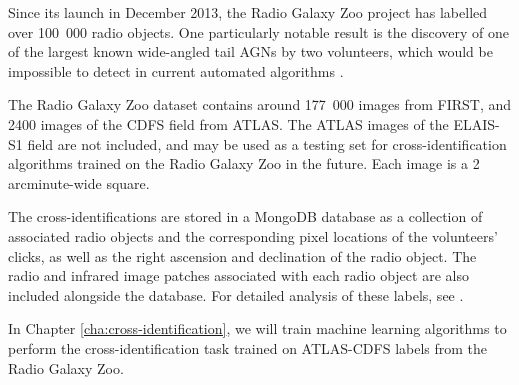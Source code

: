     Since its launch in December 2013, the Radio Galaxy Zoo project has labelled
    over 100~000 radio objects. One particularly notable result is the discovery
    of one of the largest known wide-angled tail AGNs by two volunteers, which
    would be impossible to detect in current automated algorithms
    \citep{banfield16}.

    The Radio Galaxy Zoo dataset contains around 177~000 images from FIRST, and
    2400 images of the CDFS field from ATLAS. The ATLAS images of the ELAIS-S1
    field are not included, and may be used as a testing set for
    cross-identification algorithms trained on the Radio Galaxy Zoo in the
    future. Each image is a 2 arcminute-wide square.

    The cross-identifications are stored in a MongoDB database as a collection
    of associated radio objects and the corresponding pixel locations of the
    volunteers' clicks, as well as the right ascension and declination of the
    radio object. The radio and infrared image patches associated with each
    radio object are also included alongside the database. For detailed analysis
    of these labels, see \citet{atlas-ml}.

    In Chapter \ref{cha:cross-identification}, we will train machine learning
    algorithms to perform the cross-identification task trained on ATLAS-CDFS
    labels from the Radio Galaxy Zoo.



